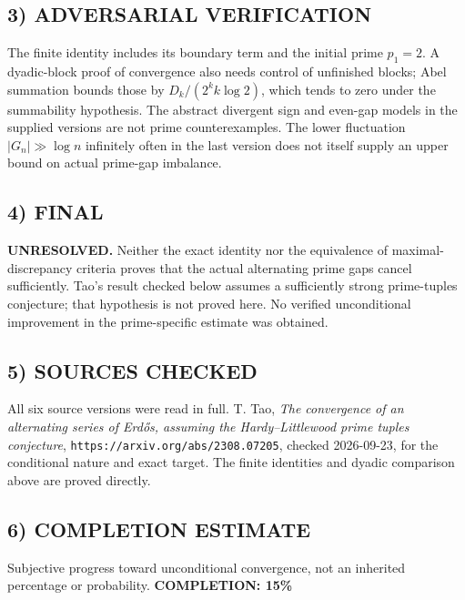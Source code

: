 \subsection*{3) ADVERSARIAL VERIFICATION}
The finite identity includes its boundary term and the initial prime $p_1=2$. A dyadic-block proof of convergence also needs control of unfinished blocks; Abel summation bounds those by $D_k/(2^kk\log2)$, which tends to zero under the summability hypothesis. The abstract divergent sign and even-gap models in the supplied versions are not prime counterexamples. The lower fluctuation $|G_n|\gg\log n$ infinitely often in the last version does not itself supply an upper bound on actual prime-gap imbalance.
\subsection*{4) FINAL}
\textbf{UNRESOLVED.} Neither the exact identity nor the equivalence of maximal-discrepancy criteria proves that the actual alternating prime gaps cancel sufficiently. Tao's result checked below assumes a sufficiently strong prime-tuples conjecture; that hypothesis is not proved here. No verified unconditional improvement in the prime-specific estimate was obtained.
\subsection*{5) SOURCES CHECKED}
All six source versions were read in full. T. Tao, \emph{The convergence of an alternating series of Erd\H{o}s, assuming the Hardy--Littlewood prime tuples conjecture}, \texttt{https://arxiv.org/abs/2308.07205}, checked 2026-09-23, for the conditional nature and exact target. The finite identities and dyadic comparison above are proved directly.
\subsection*{6) COMPLETION ESTIMATE}
Subjective progress toward unconditional convergence, not an inherited percentage or probability.
\textbf{COMPLETION: 15\%}
